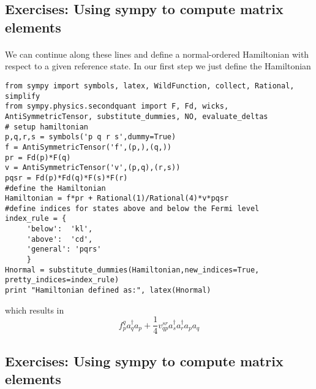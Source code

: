 \documentclass[%
twoside,                 %
final,                   %
10pt]{article}
\begin{document}
\subsection*{Exercises: Using sympy to compute matrix elements}

\paragraph{}
We can continue along these lines and define a normal-ordered Hamiltonian with respect to a given reference state.
In our first step we just define the Hamiltonian
\begin{verbatim}
from sympy import symbols, latex, WildFunction, collect, Rational, simplify
from sympy.physics.secondquant import F, Fd, wicks, AntiSymmetricTensor, substitute_dummies, NO, evaluate_deltas
# setup hamiltonian
p,q,r,s = symbols('p q r s',dummy=True)
f = AntiSymmetricTensor('f',(p,),(q,))
pr = Fd(p)*F(q)
v = AntiSymmetricTensor('v',(p,q),(r,s))
pqsr = Fd(p)*Fd(q)*F(s)*F(r)
#define the Hamiltonian
Hamiltonian = f*pr + Rational(1)/Rational(4)*v*pqsr
#define indices for states above and below the Fermi level
index_rule = {
     'below':  'kl',
     'above':  'cd',
     'general': 'pqrs'
     }
Hnormal = substitute_dummies(Hamiltonian,new_indices=True, pretty_indices=index_rule)
print "Hamiltonian defined as:", latex(Hnormal)
\end{verbatim}
which results in
\[
f^{q}_{p} a^\dagger_{q} a_{p} + \frac{1}{4} v^{sr}_{qp} a^\dagger_{s} a^\dagger_{r} a_{p} a_{q}
\]




\subsection*{Exercises: Using sympy to compute matrix elements}

\end{document}

